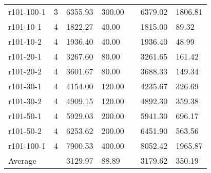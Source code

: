 \documentclass[final,5p,times,twocolumn]{elsarticle}
\begin{document}
{{{{{{{{{{{\begin{table}[htbp]
\begin{tabular}{l l l l l l l}
r101-100-1&3&6355.93&300.00&&6379.02&1806.81\\
r101-10-1&4&1822.27&40.00&&1815.00&89.32\\
r101-10-2&4&1936.40&40.00&&1936.40&48.99\\
r101-20-1&4&3267.60&80.00&&3261.65&161.42\\
r101-20-2&4&3601.67&80.00&&3688.33&149.34\\
r101-30-1&4&4154.00&120.00&&4235.67&326.69\\
r101-30-2&4&4909.15&120.00&&4892.30&359.38\\
r101-50-1&4&5929.03&200.00&&5941.30&696.17\\
r101-50-2&4&6253.62&200.00&&6451.90&563.56\\
r101-100-1&4&7900.53&400.00&&8052.42&1965.87\\
\hline
Average&&3129.97&88.89&&3179.62&350.19\\
\hline
\end{tabular}
\label{tab:pt300_10}
\end{table}

}}}}}}}}}}}
\end{document}
